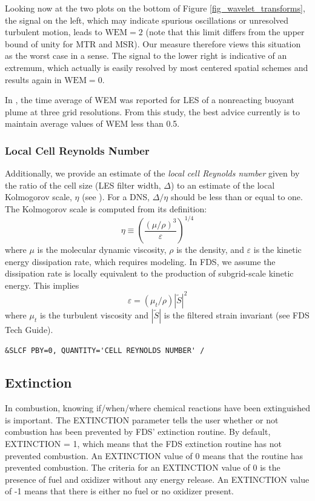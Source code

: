 \documentclass[11pt]{book}
\begin{document}
Looking now at the two plots on the bottom of Figure \ref{fig_wavelet_transforms}, the signal on the left, which may indicate spurious oscillations or unresolved turbulent motion, leads to $\mbox{WEM} = 2$ (note that this limit differs from the upper bound of unity for MTR and MSR).  Our measure therefore views this situation as the worst case in a sense.  The signal to the lower right is indicative of an extremum, which actually is easily resolved by most centered spatial schemes and results again in $\mbox{WEM}=0$.

In \cite{McDermott:2010}, the time average of WEM was reported for LES of a nonreacting buoyant plume at three grid resolutions.  From this study, the best advice currently is to maintain average values of WEM less than 0.5.

\subsubsection{Local Cell Reynolds Number}

Additionally, we provide an estimate of the \emph{local cell Reynolds number} given by the ratio of the cell size (LES filter width, $\Delta$) to an estimate of the local Kolmogorov scale, $\eta$ (see \cite{Pope:2000}).  For a DNS, $\Delta/\eta$ should be less than or equal to one. The Kolmogorov scale is computed from its definition:
\begin{equation}
\eta \equiv \left(\frac{(\mu/\rho)^3}{\varepsilon}\right)^{1/4}
\end{equation}
where $\mu$ is the molecular dynamic viscosity, $\rho$ is the density, and $\varepsilon$ is the kinetic energy dissipation rate, which requires modeling.  In FDS, we assume the dissipation rate is locally equivalent to the production of subgrid-scale kinetic energy.  This implies
\begin{equation}
\varepsilon = (\mu_t/\rho)|\tilde{S}|^2
\end{equation}
where $\mu_t$ is the turbulent viscosity and $|\tilde{S}|$ is the filtered strain invariant (see FDS Tech Guide).

\begin{lstlisting}
&SLCF PBY=0, QUANTITY='CELL REYNOLDS NUMBER' /
\end{lstlisting}

\subsection{Extinction}
\label{info:extinct_out}
In combustion, knowing if/when/where chemical reactions have been extinguished is important. The {\ct EXTINCTION} parameter tells the user whether or not combustion has been prevented by FDS' extinction routine. By default, {\ct EXTINCTION} = 1, which means that the FDS extinction routine has not prevented combustion. An {\ct EXTINCTION} value of 0 means that the routine has prevented combustion. The criteria for an {\ct EXTINCTION} value of 0 is the presence of fuel and oxidizer without any energy release. An {\ct EXTINCTION} value of -1 means that there is either no fuel or no oxidizer present.
\end{document}
